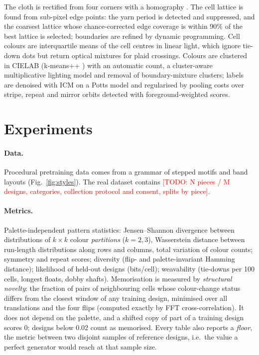 \documentclass[11pt]{article}
\newcommand{\todo}[1]{\textcolor{red}{[TODO: #1]}}
\begin{document}
The cloth is rectified from four corners with a homography \cite{hartley2004multiple}. The cell
lattice is found from sub-pixel edge points: the yarn period is detected and suppressed, and the
coarsest lattice whose chance-corrected edge coverage is within 90\% of the best lattice is
selected; boundaries are refined by dynamic programming. Cell colours are interquartile means of
the cell centres in linear light, which ignore tie-down dots but return optical mixtures for plaid
crossings. Colours are clustered in CIELAB (k-means++ \cite{arthur2007kmeans}) with an automatic
count, a cluster-aware multiplicative lighting model and removal of boundary-mixture clusters;
labels are denoised with ICM on a Potts model \cite{besag1986statistical} and regularised by
pooling costs over stripe, repeat and mirror orbits detected with foreground-weighted scores.

\section{Experiments}
\label{sec:experiments}

\paragraph{Data.}
Procedural pretraining data comes from a grammar of stepped motifs and band layouts
(Fig.~\ref{fig:styles}). The real dataset contains \todo{N pieces / M designs, categories,
collection protocol and consent, splits by piece}.

\paragraph{Metrics.}
Palette-independent pattern statistics: Jensen--Shannon divergence between distributions of
$k\times k$ colour \emph{partitions} ($k=2,3$), Wasserstein distance between run-length
distributions along rows and columns, total variation of colour counts; symmetry and repeat scores;
diversity (flip- and palette-invariant Hamming distance); likelihood of held-out designs
(bits/cell); weavability (tie-downs per 100 cells, longest floats, dobby shafts). Memorisation is
measured by \emph{structural novelty}: the fraction of pairs of neighbouring cells whose
colour-change status differs from the closest window of any training design, minimised over all
translations and the four flips (computed exactly by FFT cross-correlation). It does not depend on
the palette, and a shifted copy of part of a training design scores 0; designs below 0.02 count as
memorised. Every table also reports a \emph{floor}, the metric between two disjoint samples of
reference designs, i.e.\ the value a perfect generator would reach at that sample size.
\end{document}
